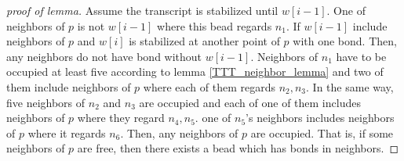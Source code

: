 \documentclass[runningheads]{llncs}
\begin{document}
\begin{proof}[proof of lemma]
Assume the transcript is stabilized until $w[i-1]$. One of neighbors of $p$ is not $w[i-1]$ where this bead regards $n_1$. If $w[i-1]$ include neighbors of $p$ and $w[i]$ is stabilized at another point of $p$ with one bond. Then, any neighbors do not have bond without $w[i-1]$. Neighbors of $n_1$ have to be occupied at least five according to lemma \ref{TTT_neighbor_lemma} and two of them include neighbors of $p$ where each of them regards $n_2, n_3$. In the same way, five neighbors of $n_2$ and $n_3$ are occupied and each of one of them includes neighbors of $p$ where they regard $n_4, n_5$. one of $n_5$'s neighbors includes neighbors of $p$ where it regards $n_6$. Then, any neighbors of $p$ are occupied. That is, if some neighbors of $p$ are free, then there exists a bead which has bonds in neighbors.
\end{proof}
\end{document}
